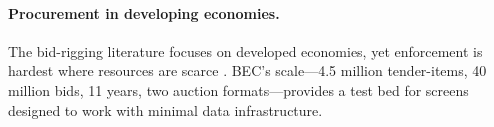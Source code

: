 \paragraph{Procurement in developing economies.}
The bid-rigging literature focuses on developed economies, yet
enforcement is hardest where resources are scarce
\citep{sanchezgraells2019screening}. BEC's scale---4.5 million
tender-items, 40 million bids, 11 years, two auction formats---provides a test bed for screens designed to work with minimal data
infrastructure.
